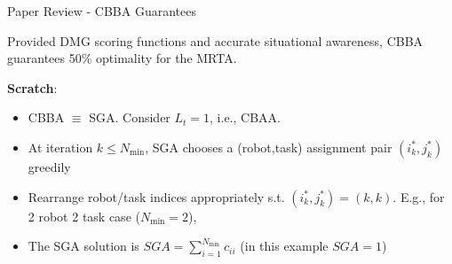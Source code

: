 \begin{frame}{Paper Review - CBBA Guarantees}
    \begin{theorem}
        Provided DMG scoring functions and accurate situational awareness, CBBA guarantees 50\% optimality for the MRTA.
    \end{theorem}
    \textbf{Scratch}: 
    \begin{itemize}
        \item CBBA $\equiv$ SGA. Consider $L_t=1$, i.e., CBAA. \pause
        \item At iteration $k\le N_{\text{min}}$, SGA chooses a (robot,task) assignment pair $\left(i^*_{k}, j^*_{k}\right)$ greedily \pause
        \item Rearrange robot/task indices appropriately s.t. $\left(i^*_{k}, j^*_{k}\right) = (k,k)$. E.g., for 2 robot 2 task case ($N_{\text{min}} = 2$),
        \item The SGA solution is $SGA =\sum_{i=1}^{N_{\text{min}}} c_{ii}$ (in this example $SGA=1$)
        
    \end{itemize}
\end{frame}

